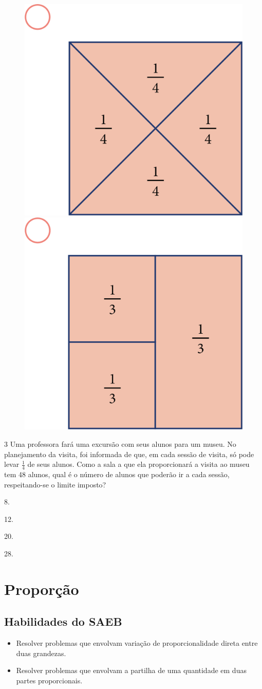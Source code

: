 \begin{figure}[htpb!]
\includegraphics[width=.3\textwidth]{media/image68.png}
\includegraphics[width=.3\textwidth]{media/image69.png}
\end{figure}

\num{3} Uma professora fará uma excursão com seus alunos para um museu. No
planejamento da visita, foi informada de que, em cada sessão de visita, só
pode levar $\frac{1}{4}$ de seus alunos. Como a sala a que ela proporcionará a
visita ao museu tem 48 alunos, qual é o número de alunos que poderão ir a
cada sessão, respeitando-se o limite imposto?

\begin{escolha}
\item
  8.

\item
  12.

\item
  20.

\item
  28.
\end{escolha}

\chapter{Proporção}

\section{Habilidades do SAEB}

\begin{itemize}
\item Resolver problemas que envolvam variação de proporcionalidade direta
entre duas grandezas.

\item Resolver problemas que envolvam a partilha de uma quantidade em duas
partes proporcionais.
\end{itemize}

